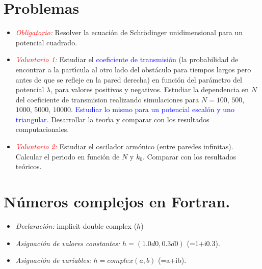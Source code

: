 \documentclass[12pt]{iopart}
\def\az{\textcolor{blue}}
\def\ro{\textcolor{red}}
\begin{document}
\section{Problemas}
\begin{itemize}
\item{\ro{\it Obligatorio:}} Resolver la ecuaci{\'o}n de Schr\"odinger unidimensional para un potencial cuadrado.

\item{\ro{\it Voluntario 1:}} Estudiar el \az{coeficiente de transmisi{\'o}n} (la probabilidad de encontrar a la part{\'\i}cula al
otro lado del obst{\'a}culo para tiempos largos pero antes de que se refleje en la pared derecha) en funci{\'o}n
del par{\'a}metro del potencial $\lambda$, para valores positivos y negativos. Estudiar la dependencia en $N$ del coeficiente de transmision realizando simulaciones para $N=100$, $500$, $1000$, $5000$, $10000$.
\az{Estudiar lo mismo para un potencial escal{\'o}n y uno triangular}. Desarrollar la teor{\'\i}a y comparar con los resultados computacionales.


\item{\ro{\it Voluntario 2:}} Estudiar el oscilador arm{\'o}nico (entre paredes infinitas). Calcular el periodo en funci{\'o}n de $N$ y $k_0$. Comparar con los resultados te{\'o}ricos.
\end{itemize}

\section*{N{\'u}meros complejos en Fortran.}

\begin{itemize}
\item{}{\it Declaraci{\'o}n:} implicit double complex ($h$)
\item{}{\it Asignaci{\'o}n de valores constantes:} $h=(1.0d0,0.3d0)$ (=1+i0.3).
\item{}{\it Asignaci{\'o}n de variables:} $h=complex(a,b)$ (=a+ib).
\end{itemize}




\end{document}
